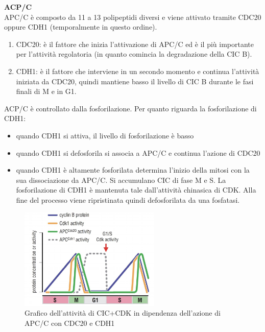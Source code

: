             \textbf{ACP/C}\\
                APC/C è composto da 11 a 13 polipeptidi diversi e viene attivato tramite CDC20 oppure CDH1 (temporalmente in questo ordine).\\
                \begin{enumerate}
                    \item CDC20: è il fattore che inizia l'attivazione di APC/C ed è il più importante per l'attività regolatoria (in quanto comincia la degradazione della CIC B).
                    \item CDH1: è il fattore che interviene in un secondo momento e continua l'attività iniziata da CDC20, quindi mantiene basso il livello di CIC B durante le fasi finali di M e in G1. 
                \end{enumerate}
                ACP/C è controllato dalla fosforilazione. Per quanto riguarda la fosforilazione di CDH1: 
                \begin{itemize}
                    \item quando CDH1 si attiva, il livello di fosforilazione è basso
                    \item quando CDH1 si defosforila si associa a APC/C e continua l'azione di CDC20
                    \item quando CDH1 è altamente fosforilata determina l'inizio della mitosi con la sua dissociazione da APC/C. Si accumulano CIC di fase M e S. 
                    La fosforilazione di CDH1 è mantenuta tale dall'attività chinasica di CDK. 
                    Alla fine del processo viene ripristinata quindi defosforilata da una fosfatasi.
                \end{itemize}
                
                \begin{figure}[h]
                    \centering
                    \includegraphics[width=0.6\textwidth]{images/attivita_APCC_CDC20_CDH1.JPG}
                    \caption{\small Grafico dell'attività di CIC+CDK in dipendenza dell'azione di APC/C con CDC20 e CDH1}
                    \label{fig:mesh1}
                \end{figure}
            
